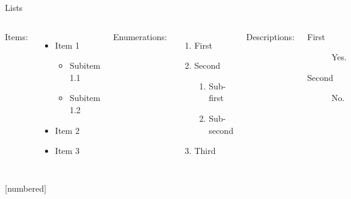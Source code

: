     \begin{frame}{Lists}
        \begin{columns}[t, onlytextwidth]
                Items:
                \begin{itemize}
                    \item Item 1
                    \begin{itemize}
                        \item Subitem 1.1
                        \item Subitem 1.2
                    \end{itemize}
                    \item Item 2
                    \item Item 3
                \end{itemize}
            
                Enumerations:
                \begin{enumerate}
                    \item First
                    \item Second
                    \begin{enumerate}
                        \item Sub-first
                        \item Sub-second
                    \end{enumerate}
                    \item Third
                \end{enumerate}
            
                Descriptions:
                \begin{description}
                    \item[First] Yes.
                    \item[Second] No.
                \end{description}
        \end{columns}
    \end{frame}
[numbered]
